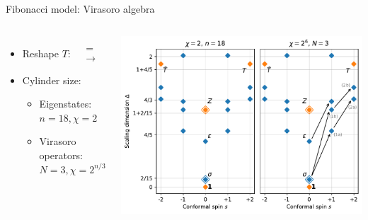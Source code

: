 \documentclass{fdubeamer}
\newcommand{\tikzinput}[1]{}
\newcommand{\1}{\mathbb{1}}
\begin{document}
\begin{frame}{Fibonacci model: Virasoro algebra}

\begin{columns}[T]


    \begin{itemize}
      \item Reshape $T$:
        \begingroup
          \scriptsize
          \tikzset{x=1em, y=1em, node font=\tiny}
          $
            \begin{aligned}
              \tikzinput{fibonacci/padded-tensor-1} &= \tikzinput{fibonacci/padded-tensor-2} \\
              &\to \tikzinput{fibonacci/padded-tensor-3}
            \end{aligned}
          $
        \endgroup
      \item Cylinder size:

        \begin{itemize}
          \item Eigenstates: $n=18, \chi=2$
          \item Virasoro operators: $N=3, \chi=2^{n/3}$
        \end{itemize}
    \end{itemize}


    \vspace{1em}
    \includegraphics[width=\textwidth]{images/fibonacci/fib-virasoro.pdf}

\end{columns}

\end{frame}
\end{document}
